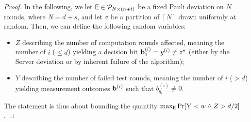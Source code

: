 \begin{proof}
In the following, we let $\mathsf{E}\in\mathcal{P}_{N\times(n+t)}$ be a fixed Pauli deviation on $N$ rounds, where $N=d+s$, and let $\sigma$ be a partition of $[N]$ drawn uniformly at random.
Then, we can define the following random variables:
\begin{itemize}
    \item $Z$ describing the number of computation rounds affected, meaning the number of $i$ ($\leq d$) yielding a decision bit $\mathbf b^{(i)}_1 = y^{(i)}\neq z^\star$ (either by the Server deviation or by inherent failure of the algorithm);
    \item $Y$ describing the number of failed test rounds, meaning the number of $i$ ($>d$) yielding measurement outcomes $\mathbf b^{(i)}$ such that $b^{(i)}_{q_i}\neq0$.
\end{itemize}
The statement is thus about bounding the quantity $\max_{\mathsf{E}} \Pr[Y < w \wedge Z > d/2]$.


\end{proof}
